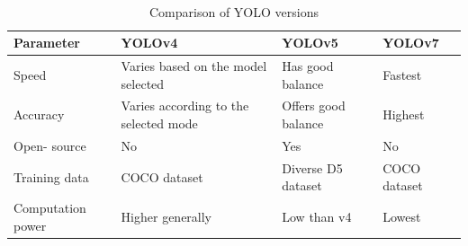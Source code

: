 \documentclass[12pt,a4paper]{report}
\begin{document}
\begin{table}[H]
\begin{center}
\caption{Comparison of YOLO versions}%
\hspace*{0.2in} 
\\
\begin{tabular}{| p{3cm} | p{4cm} | p{4cm} | p{2cm} |}
\hline
{\bf{Parameter}}             &{\bf{YOLOv4}} & {\bf{YOLOv5}}             &{\bf{YOLOv7}}  \\ \hline
Speed& Varies based on the model selected & Has good balance & Fastest \\ \hline
Accuracy & Varies according   to the selected mode &	Offers good balance &	Highest\\ \hline
Open- source &	No &	Yes	& No \\ \hline
Training data	& COCO
dataset &	Diverse D5 dataset &	COCO
dataset
\\ \hline
Computation power &	Higher generally	& Low than v4	& Lowest \\ \hline
\end{tabular}
\end{center}
\end{table}
\end{document}
